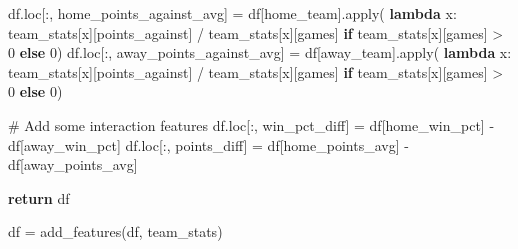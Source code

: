 \documentclass[
  letterpaper,
  DIV=11,
  numbers=noendperiod]{scrartcl}
\newenvironment{Shaded}{\begin{snugshade}}{\end{snugshade}}
\newcommand{\BuiltInTok}[1]{\textcolor[rgb]{0.00,0.23,0.31}{#1}}
\newcommand{\CommentTok}[1]{\textcolor[rgb]{0.37,0.37,0.37}{#1}}
\newcommand{\ControlFlowTok}[1]{\textcolor[rgb]{0.00,0.23,0.31}{\textbf{#1}}}
\newcommand{\DecValTok}[1]{\textcolor[rgb]{0.68,0.00,0.00}{#1}}
\newcommand{\KeywordTok}[1]{\textcolor[rgb]{0.00,0.23,0.31}{\textbf{#1}}}
\newcommand{\NormalTok}[1]{\textcolor[rgb]{0.00,0.23,0.31}{#1}}
\newcommand{\OperatorTok}[1]{\textcolor[rgb]{0.37,0.37,0.37}{#1}}
\newcommand{\StringTok}[1]{\textcolor[rgb]{0.13,0.47,0.30}{#1}}
\begin{document}
\begin{Shaded}
\begin{Highlighting}[]
\NormalTok{    df.loc[:, }\StringTok{\textquotesingle{}home\_points\_against\_avg\textquotesingle{}}\NormalTok{] }\OperatorTok{=}\NormalTok{ df[}\StringTok{\textquotesingle{}home\_team\textquotesingle{}}\NormalTok{].}\BuiltInTok{apply}\NormalTok{(}
        \KeywordTok{lambda}\NormalTok{ x: team\_stats[x][}\StringTok{\textquotesingle{}points\_against\textquotesingle{}}\NormalTok{] }\OperatorTok{/}\NormalTok{ team\_stats[x][}\StringTok{\textquotesingle{}games\textquotesingle{}}\NormalTok{] }\ControlFlowTok{if}\NormalTok{ team\_stats[x][}\StringTok{\textquotesingle{}games\textquotesingle{}}\NormalTok{] }\OperatorTok{\textgreater{}} \DecValTok{0} \ControlFlowTok{else} \DecValTok{0}\NormalTok{)}
\NormalTok{    df.loc[:, }\StringTok{\textquotesingle{}away\_points\_against\_avg\textquotesingle{}}\NormalTok{] }\OperatorTok{=}\NormalTok{ df[}\StringTok{\textquotesingle{}away\_team\textquotesingle{}}\NormalTok{].}\BuiltInTok{apply}\NormalTok{(}
        \KeywordTok{lambda}\NormalTok{ x: team\_stats[x][}\StringTok{\textquotesingle{}points\_against\textquotesingle{}}\NormalTok{] }\OperatorTok{/}\NormalTok{ team\_stats[x][}\StringTok{\textquotesingle{}games\textquotesingle{}}\NormalTok{] }\ControlFlowTok{if}\NormalTok{ team\_stats[x][}\StringTok{\textquotesingle{}games\textquotesingle{}}\NormalTok{] }\OperatorTok{\textgreater{}} \DecValTok{0} \ControlFlowTok{else} \DecValTok{0}\NormalTok{)}
    
    \CommentTok{\# Add some interaction features}
\NormalTok{    df.loc[:, }\StringTok{\textquotesingle{}win\_pct\_diff\textquotesingle{}}\NormalTok{] }\OperatorTok{=}\NormalTok{ df[}\StringTok{\textquotesingle{}home\_win\_pct\textquotesingle{}}\NormalTok{] }\OperatorTok{{-}}\NormalTok{ df[}\StringTok{\textquotesingle{}away\_win\_pct\textquotesingle{}}\NormalTok{]}
\NormalTok{    df.loc[:, }\StringTok{\textquotesingle{}points\_diff\textquotesingle{}}\NormalTok{] }\OperatorTok{=}\NormalTok{ df[}\StringTok{\textquotesingle{}home\_points\_avg\textquotesingle{}}\NormalTok{] }\OperatorTok{{-}}\NormalTok{ df[}\StringTok{\textquotesingle{}away\_points\_avg\textquotesingle{}}\NormalTok{]}
    
    \ControlFlowTok{return}\NormalTok{ df}

\NormalTok{df }\OperatorTok{=}\NormalTok{ add\_features(df, team\_stats)}
\end{Highlighting}
\end{Shaded}
\end{document}
